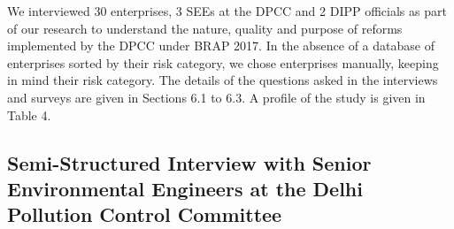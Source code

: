 \documentclass[a4paper, 12pt]{article}
\begin{document}
		We interviewed 30 enterprises, 3 SEEs at the DPCC and 2 DIPP officials as part of our research to understand the nature, quality and purpose of reforms implemented by the DPCC under BRAP 2017. In the absence of a database of enterprises sorted by their risk category, we chose enterprises manually, keeping in mind their risk category. The details of the questions asked in the interviews and surveys are given in Sections 6.1 to 6.3. A profile of the study is given in Table 4. \\
		
		
		\subsection{Semi-Structured Interview with Senior Environmental Engineers at the Delhi Pollution Control Committee}
\end{document}
